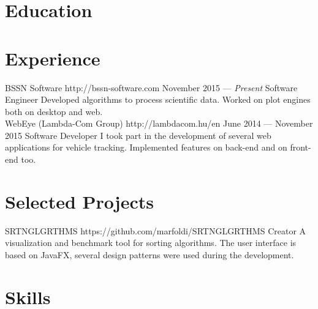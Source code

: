 \documentclass{resume}
\begin{document}

\smallskip

\section{Education}


\section{Experience}

\employer
	{BSSN Software}
	{http://bssn-software.com}
	{November 2015 --- \emph{Present}}
	{Software Engineer}
	{Developed algorithms to process scientific data. Worked on plot engines both on desktop and web.\\}
\employer
	{WebEye (Lambda-Com Group)}
	{http://lambdacom.hu/en}
	{June 2014 --- November 2015}
	{Software Developer}
	{I took part in the development of several web applications for vehicle tracking. Implemented features on back-end and on front-end too.}
	
\section{Selected Projects}

\project
	{SRTNGLGRTHMS}
	{https://github.com/marfoldi/SRTNGLGRTHMS}
	{Creator}
	{A visualization and benchmark tool for sorting algorithms. The user interface is based on JavaFX, several design patterns were used during the development.}
	
\section{Skills}

\end{document}
